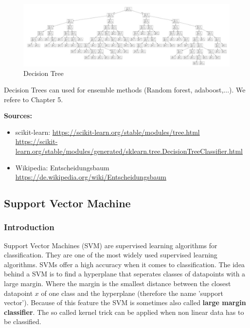 \begin{figure}[hbtp]
	\centering
	\includegraphics[scale=0.5]{tree}
	\caption{Decision Tree}
	\label{fig:Datensatz - unbearbeitet}
\end{figure}


Decision Trees can used for ensemble methods (Random forest, adaboost,...). We refere to Chapter 5.

\textbf{Sources:}
\begin{itemize}
\item scikit-learn: \hyperlink{https://scikit-learn.org/stable/modules/tree.html}{https://scikit-learn.org/stable/modules/tree.html} \\
\hyperlink{https://scikit-learn.org/stable/modules/generated/sklearn.tree.DecisionTreeClassifier.html}{https://scikit-learn.org/stable/modules/generated/sklearn.tree.DecisionTreeClassifier.html}
\item Wikipedia: Entscheidungsbaum \hyperlink{https://de.wikipedia.org/wiki/Entscheidungsbaum}{https://de.wikipedia.org/wiki/Entscheidungsbaum}
\end{itemize}

\subsection{Support Vector Machine}
\subsubsection{Introduction}

Support Vector Machines (SVM) are supervised learning algorithms for classification.
They are one of the most widely used supervised learning algorithms. 
SVMs offer a high accuracy when it comes to classification.
The idea behind a SVM is to find a hyperplane that seperates classes of datapoints with a large margin. Where the margin is the smallest distance between the closest datapoint $x$ of one class and the hyperplane (therefore the name 'support vector'). Because of this feature the SVM is sometimes also called \textbf{large margin classifier}.
The so called kernel trick can be applied when non linear data has to be classified.

